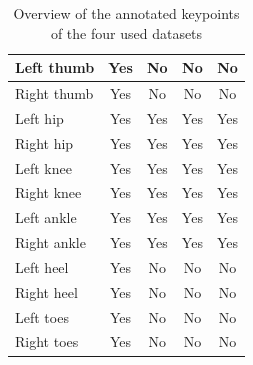 \documentclass[./main.tex]{subfiles}
\begin{document}
\begin{table}[htbp]
\begin{tabular}{|l|c|c|c|c|}
        Left thumb & Yes & No & No & No \\ \hline
        Right thumb & Yes & No & No & No \\ \hline
        Left hip & Yes & Yes & Yes & Yes \\ \hline
        Right hip & Yes & Yes & Yes & Yes \\ \hline
        Left knee & Yes & Yes & Yes & Yes \\ \hline
        Right knee & Yes & Yes & Yes & Yes \\ \hline
        Left ankle & Yes & Yes & Yes & Yes \\ \hline
        Right ankle & Yes & Yes & Yes & Yes \\ \hline
        Left heel & Yes & No & No & No \\ \hline
        Right heel & Yes & No & No & No \\ \hline
        Left toes & Yes & No & No & No \\ \hline
        Right toes & Yes & No & No & No \\ \hline
    \end{tabular}
    \caption{Overview of the annotated keypoints of the four used datasets}
    \label{tab:keypoints}
\end{table}
\end{document}

